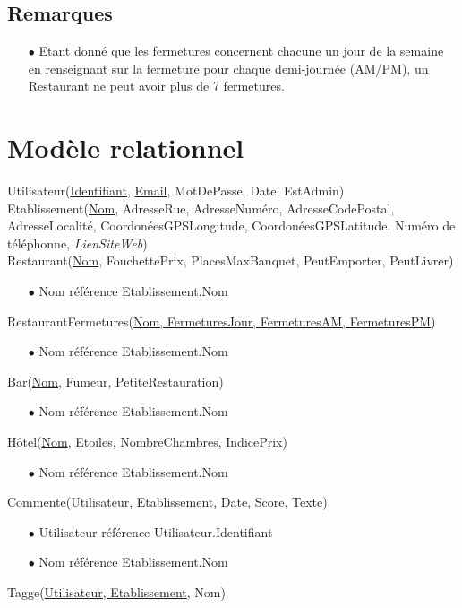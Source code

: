 \documentclass[a4paper, 11pt]{article}
\begin{document}
\subsection*{Remarques}
\begin{itemize}
	\item[$\bullet$] Etant donné que les fermetures concernent chacune un jour de la semaine en renseignant sur la fermeture pour chaque demi-journée (AM/PM), un Restaurant ne peut avoir plus de 7 fermetures. 
\end{itemize}

\section*{Modèle relationnel}
\noindent
Utilisateur(\underline{Identifiant}, \underline{Email}, MotDePasse, Date, EstAdmin)\\
Etablissement(\underline{Nom}, AdresseRue, AdresseNuméro, AdresseCodePostal, AdresseLocalité, CoordonéesGPSLongitude, CoordonéesGPSLatitude, Numéro de téléphonne, \textit{LienSiteWeb})\\
Restaurant(\underline{Nom}, FouchettePrix, PlacesMaxBanquet, PeutEmporter, PeutLivrer)
\begin{itemize}
	\item[$\bullet$] Nom référence Etablissement.Nom
\end{itemize}
RestaurantFermetures(\underline{Nom, FermeturesJour, FermeturesAM, FermeturesPM})
\begin{itemize}
	\item[$\bullet$] Nom référence Etablissement.Nom
\end{itemize}
Bar(\underline{Nom}, Fumeur, PetiteRestauration)
\begin{itemize}
	\item[$\bullet$] Nom référence Etablissement.Nom
\end{itemize}
Hôtel(\underline{Nom}, Etoiles, NombreChambres, IndicePrix)
\begin{itemize}
	\item[$\bullet$] Nom référence Etablissement.Nom
\end{itemize}
Commente(\underline{Utilisateur, Etablissement}, Date, Score, Texte)
\begin{itemize}
	\item[$\bullet$] Utilisateur référence Utilisateur.Identifiant
	\item[$\bullet$] Nom référence Etablissement.Nom
\end{itemize}
Tagge(\underline{Utilisateur, Etablissement}, Nom)
\end{document}
